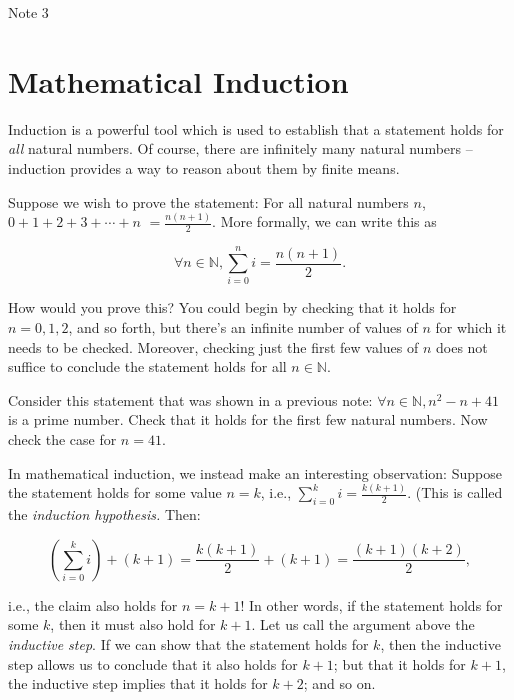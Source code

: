 \documentclass[12pt,a4paper]{article}
\theoremstyle{definition}
\begin{document}
\raggedright

\begin{center}
\huge{Note 3}
\end{center}

\section*{Mathematical Induction}
Induction is a powerful tool which is used to establish that a statement holds  for \textit{all} natural numbers. Of course, there are infinitely many natural numbers -- induction provides a way to reason about them by finite means.

\bigbreak

Suppose we wish to prove the statement: For all natural numbers $n$, $0+1+2+3+\cdots+n$ $=\frac{n(n+1)}{2}$. More formally, we can write this as

\begin{equation}\label{eq1}
\forall n\in\mathbb{N}, \sum_{i=0}^{n}i=\frac{n(n+1)}{2}.
\end{equation}

How would you prove this? You could begin by checking that it holds for $n=0, 1, 2$, and so forth, but there's an infinite number of values of $n$ for which it needs to be checked. Moreover, checking just the first few values of $n$ does not suffice to conclude the statement holds for all $n\in\mathbb{N}$.

\bigbreak

Consider this statement that was shown in a previous note: $\forall n\in\mathbb{N}, n^2-n+41$ is a prime number. Check that it holds for the first few natural numbers. Now check the case for $n=41$.

\bigbreak

In mathematical induction, we instead make an interesting observation: Suppose the statement holds for some value $n=k$, i.e., $\sum_{i=0}^{k}i=\frac{k(k+1)}{2}$. (This is called the \textit{induction hypothesis.} Then:

\begin{equation}\label{eq2}
\left(\sum_{i=0}^{k}i\right)+(k+1)=\frac{k(k+1)}{2}+(k+1)=\frac{(k+1)(k+2)}{2},
\end{equation}

i.e., the claim also holds for $n=k+1$! In other words, if the statement holds for some $k$, then it must also hold for $k+1$. Let us call the argument above the \textit{inductive step}. If we can show that the statement holds for $k$, then the inductive step allows us to conclude that it also holds for $k+1$; but that it holds for $k+1$, the inductive step implies that it holds for $k+2$; and so on.
\end{document}
